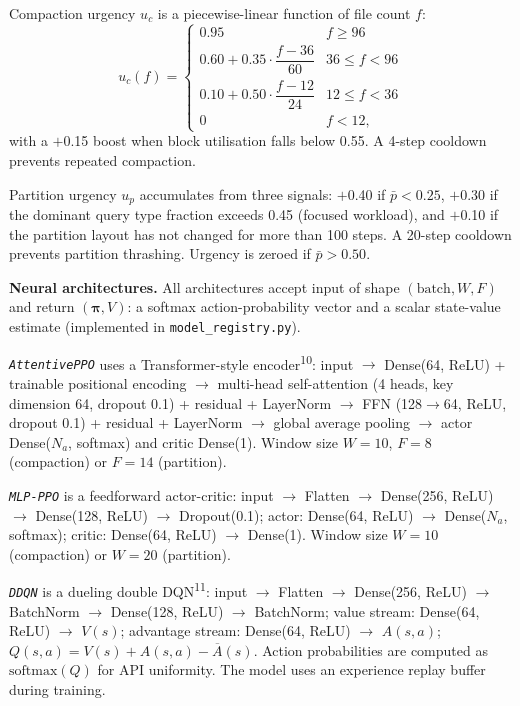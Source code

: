 \documentclass[fleqn,10pt]{wlscirep}
\newcommand{\attentive}{\texttt{AttentivePPO}}
\newcommand{\mlpppo}{\texttt{MLP-PPO}}
\newcommand{\ddqn}{\texttt{DDQN}}
\begin{document}
Compaction urgency $u_c$ is a piecewise-linear function of file count $f$:
\begin{equation}
u_c(f) = \begin{cases}
0.95 & f \geq 96 \\[2pt]
0.60 + 0.35 \cdot \dfrac{f - 36}{60} & 36 \leq f < 96 \\[6pt]
0.10 + 0.50 \cdot \dfrac{f - 12}{24} & 12 \leq f < 36 \\[2pt]
0    & f < 12,
\end{cases}
\end{equation}
with a $+$0.15 boost when block utilisation falls below 0.55.
A 4-step cooldown prevents repeated compaction.

Partition urgency $u_p$ accumulates from three signals: $+$0.40 if
$\bar{p} < 0.25$, $+$0.30 if the dominant query type fraction exceeds
0.45 (focused workload), and $+$0.10 if the partition layout has not
changed for more than 100 steps. A 20-step cooldown prevents partition
thrashing. Urgency is zeroed if $\bar{p} > 0.50$.

\textbf{Neural architectures.}
All architectures accept input of shape $(\text{batch}, W, F)$ and
return $(\boldsymbol{\pi}, V)$: a softmax action-probability vector
and a scalar state-value estimate
(implemented in \texttt{model\_registry.py}).

\textit{\attentive{}} uses a Transformer-style
encoder\textsuperscript{10}:
input $\to$ Dense(64, ReLU) + trainable positional encoding
$\to$ multi-head self-attention (4 heads, key dimension 64,
dropout 0.1) + residual + LayerNorm
$\to$ FFN (128$\to$64, ReLU, dropout 0.1) + residual + LayerNorm
$\to$ global average pooling $\to$ actor Dense($N_a$, softmax) and
critic Dense(1). Window size $W = 10$, $F = 8$ (compaction) or
$F = 14$ (partition).

\textit{\mlpppo{}} is a feedforward actor-critic:
input $\to$ Flatten $\to$ Dense(256, ReLU) $\to$ Dense(128, ReLU)
$\to$ Dropout(0.1); actor: Dense(64, ReLU) $\to$ Dense($N_a$, softmax);
critic: Dense(64, ReLU) $\to$ Dense(1).
Window size $W = 10$ (compaction) or $W = 20$ (partition).

\textit{\ddqn{}} is a dueling double DQN\textsuperscript{11}:
input $\to$ Flatten $\to$ Dense(256, ReLU) $\to$ BatchNorm $\to$
Dense(128, ReLU) $\to$ BatchNorm; value stream: Dense(64, ReLU) $\to$
$V(s)$; advantage stream: Dense(64, ReLU) $\to$ $A(s,a)$;
$Q(s,a) = V(s) + A(s,a) - \overline{A}(s)$.
Action probabilities are computed as $\text{softmax}(Q)$ for API
uniformity. The model uses an experience replay buffer during training.
\end{document}
